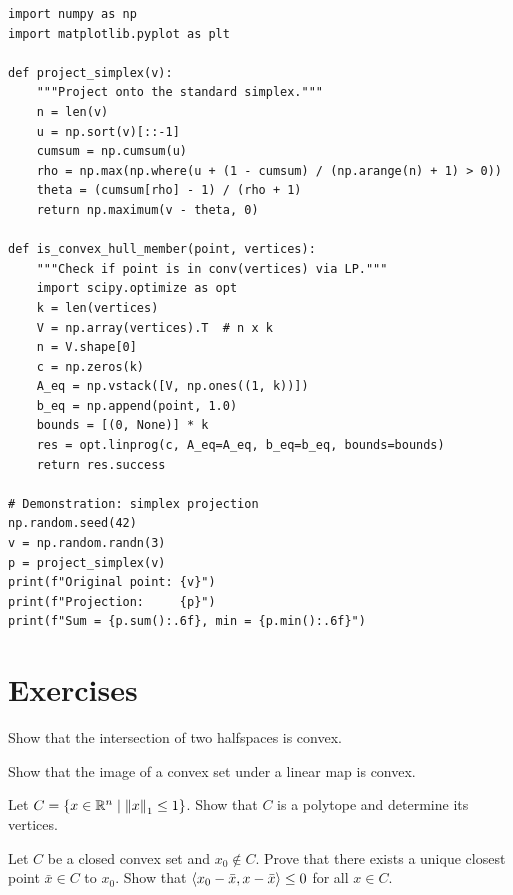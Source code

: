 \begin{codeblock}[title=\textbf{Simplex projection and convexity verification}]
\begin{verbatim}
import numpy as np
import matplotlib.pyplot as plt

def project_simplex(v):
    """Project onto the standard simplex."""
    n = len(v)
    u = np.sort(v)[::-1]
    cumsum = np.cumsum(u)
    rho = np.max(np.where(u + (1 - cumsum) / (np.arange(n) + 1) > 0))
    theta = (cumsum[rho] - 1) / (rho + 1)
    return np.maximum(v - theta, 0)

def is_convex_hull_member(point, vertices):
    """Check if point is in conv(vertices) via LP."""
    import scipy.optimize as opt
    k = len(vertices)
    V = np.array(vertices).T  # n x k
    n = V.shape[0]
    c = np.zeros(k)
    A_eq = np.vstack([V, np.ones((1, k))])
    b_eq = np.append(point, 1.0)
    bounds = [(0, None)] * k
    res = opt.linprog(c, A_eq=A_eq, b_eq=b_eq, bounds=bounds)
    return res.success

# Demonstration: simplex projection
np.random.seed(42)
v = np.random.randn(3)
p = project_simplex(v)
print(f"Original point: {v}")
print(f"Projection:     {p}")
print(f"Sum = {p.sum():.6f}, min = {p.min():.6f}")
\end{verbatim}
\end{codeblock}

\section{Exercises}

\begin{exercise}[$\star$]
Show that the intersection of two halfspaces is convex.
\end{exercise}

\begin{exercise}[$\star$]
Show that the image of a convex set under a linear map is convex.
\end{exercise}

\begin{exercise}[$\star\star$]
Let $C = \{x \in \mathbb{R}^n \mid \left\| x \right\|_1 \leq 1\}$. Show that $C$ is a polytope
and determine its vertices.
\end{exercise}

\begin{exercise}[$\star\star$]
Let $C$ be a closed convex set and $x_0 \notin C$. Prove that there exists a unique
closest point $\bar{x} \in C$ to $x_0$. Show that
$\langle x_0 - \bar{x}, x - \bar{x} \rangle \leq 0$ for all $x \in C$.
\end{exercise}

